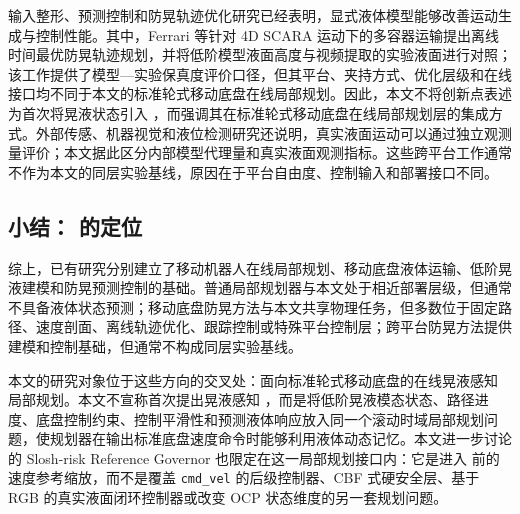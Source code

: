 输入整形、预测控制和防晃轨迹优化研究已经表明，显式液体模型能够改善运动生成与控制性能\cite{A07_Singer1990,A12_Okatsuka2011,C05_Okatsuka2012,C01_Ferrari2026,C02_Muchacho2022,C03_Moriello2018,C04_Kuriyama2008,C06_Viet2024}。其中，Ferrari 等针对 4D SCARA 运动下的多容器运输提出离线时间最优防晃轨迹规划，并将低阶模型液面高度与视频提取的实验液面进行对照\cite{C01_Ferrari2026}；该工作提供了模型—实验保真度评价口径，但其平台、夹持方式、优化层级和在线接口均不同于本文的标准轮式移动底盘在线局部规划。因此，本文不将创新点表述为首次将晃液状态引入 \MPC{}，而强调其在标准轮式移动底盘在线局部规划层的集成方式。外部传感、机器视觉和液位检测研究还说明，真实液面运动可以通过独立观测量评价\cite{A08_Weaver2024,A09_Bobovnik2021,A10_Shao2026,A11_Ren2024}；本文据此区分内部模型代理量和真实液面观测指标。这些跨平台工作通常不作为本文的同层实验基线，原因在于平台自由度、控制输入和部署接口不同。

\subsection{小结：\SPMPC{} 的定位}

综上，已有研究分别建立了移动机器人在线局部规划、移动底盘液体运输、低阶晃液建模和防晃预测控制的基础。普通局部规划器与本文处于相近部署层级，但通常不具备液体状态预测；移动底盘防晃方法与本文共享物理任务，但多数位于固定路径、速度剖面、离线轨迹优化、跟踪控制或特殊平台控制层；跨平台防晃方法提供建模和控制基础，但通常不构成同层实验基线。

本文的研究对象位于这些方向的交叉处：面向标准轮式移动底盘的在线晃液感知 \MPCC{} 局部规划。本文不宣称首次提出晃液感知 \MPC{}，而是将低阶晃液模态状态、路径进度、底盘控制约束、控制平滑性和预测液体响应放入同一个滚动时域局部规划问题，使规划器在输出标准底盘速度命令时能够利用液体动态记忆。本文进一步讨论的 Slosh-risk Reference Governor 也限定在这一局部规划接口内：它是进入 \MPCC{} 前的速度参考缩放，而不是覆盖 \texttt{cmd\_vel} 的后级控制器、CBF 式硬安全层、基于 RGB 的真实液面闭环控制器或改变 OCP 状态维度的另一套规划问题。
